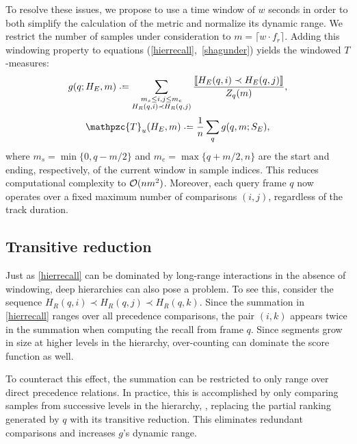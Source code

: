 \documentclass{article}
\def\shag{\ensuremath{\mathpzc{T}}}
\begin{document}
To resolve these issues, we propose to use a time window of $w$ seconds in order to both simplify the 
calculation of the metric and normalize its dynamic range.
We restrict the number of samples under consideration to $m = \lceil w \cdot f_r \rceil$.
Adding this windowing property to equations (\ref{hierrecall},~\ref{shagunder}) yields the windowed $T$-measures:
\begin{equation}
  g(q ; H_E, m) \defeq \sum_{\substack{
  m_s \leq i,j \leq m_e \\ 
  H_R(q, i) \prec H_R(q, j) }} \frac{\ind{H_E(q, i) \prec H_E(q,
  j)}}{Z_q(m)},\label{windowrecall}
\end{equation}
\begin{equation}
\shag_u(H_E, m) \defeq \frac{1}{n} \sum_q g(q,m ; S_E),
\end{equation}
where $m_s = \min\{0,q-m/2\}$ and $m_e = \max\{q+m/2,n\}$ are the start and ending, respectively, of the current window in sample indices.
This reduces computational complexity to $\mathcal{O}(nm^2)$.  Moreover, each query frame $q$ now operates over a
fixed maximum number of comparisons $(i, j)$, regardless of the track duration.


\subsection{Transitive reduction}

Just as \cref{hierrecall} can be dominated by long-range interactions in the absence of windowing, deep hierarchies can also pose a problem.
To see this, consider the sequence $H_R(q, i) \prec H_R(q, j) \prec H_R(q, k)$.
Since the summation in \cref{hierrecall} ranges over all precedence comparisons, the pair $(i, k)$ appears twice in the summation when computing the recall from frame $q$.  
Since segments grow in size at higher levels in the hierarchy, over-counting can dominate the score function as well.

To counteract this effect, the summation can be restricted to only range over direct precedence relations.
In practice, this is accomplished by only comparing samples from successive levels in the hierarchy, \ie, 
replacing the partial ranking generated by $q$ with its transitive reduction.
This eliminates redundant comparisons and increases $g$'s dynamic range.


\end{document}
